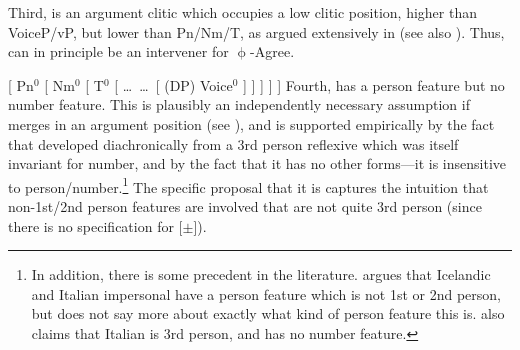 \documentclass[output=paper,colorlinks,citecolor=brown,
]{langscibook}
\begin{document}
Third, \sti is an argument clitic which occupies a low clitic position, higher than VoiceP/vP, but lower than Pn/Nm/T, as argued extensively in \citet[ch.2]{Wood2015book} (see also  \citealt{eythors:1995ab,Kissock:1997gm,SigMin,Svenonius:2005vx,Svenonius:2006zt}).  Thus, \sti can in principle be an intervener for $\upphi$-Agree. %

\ea
{ [ Pn$^0$ [ Nm$^0$ [ T$^0$ [ \dots\ \sti \dots\ [ (DP) Voice$^0$ ] ] ] ] ] }
\z
Fourth, \sti{} has a person feature but no number feature.  This is plausibly an  independently necessary assumption if \sti merges in an argument position (see \citealt{Wood2015book}), and is  supported empirically by the fact that \sti developed diachronically from a 3rd person reflexive which was itself invariant for number, and by the fact that it has no other forms---it is insensitive to person/number.\footnote{In addition, there is some precedent in the literature. \cite{DAlessandro:2003oy} argues that Icelandic \sti and Italian impersonal  have a person feature which is not 1st or 2nd person, but does not say more about exactly what kind of person feature this is. \cite{Taraldsen:1995om} also claims that Italian  is 3rd person, and has no number feature.} The specific proposal that it is  captures the intuition that non-1st/2nd person features are involved that are not quite 3rd person (since there is no specification for [$\pm$]). 
\end{document}

